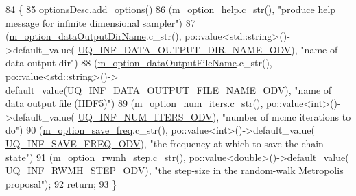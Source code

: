\begin{DoxyCode}
84 \{
85   optionsDesc.add\_options()
86     (\hyperlink{class_q_u_e_s_o_1_1_infinite_dimensional_m_c_m_c_sampler_options_a897fdd1438ecdd2cd9efe5b1abad55ba}{m\_option\_help}.c\_str(), \textcolor{stringliteral}{"produce help message for infinite dimensional sampler"})
87     (\hyperlink{class_q_u_e_s_o_1_1_infinite_dimensional_m_c_m_c_sampler_options_a75dac93b87f4e93ffef95b35c7382ad2}{m\_option\_dataOutputDirName}.c\_str(), po::value<std::string>()->default\_value(
      \hyperlink{_infinite_dimensional_m_c_m_c_sampler_options_8_c_aec1cc3af00e966ad1f72d4991db506f9}{UQ\_INF\_DATA\_OUTPUT\_DIR\_NAME\_ODV}), \textcolor{stringliteral}{"name of data output dir"})
88     (\hyperlink{class_q_u_e_s_o_1_1_infinite_dimensional_m_c_m_c_sampler_options_a4c405def589baa661b5e76f0ca0ef280}{m\_option\_dataOutputFileName}.c\_str(), po::value<std::string>()->
      default\_value(\hyperlink{_infinite_dimensional_m_c_m_c_sampler_options_8_c_a94a16132b1d2694fe1ba4602594e7bc7}{UQ\_INF\_DATA\_OUTPUT\_FILE\_NAME\_ODV}), \textcolor{stringliteral}{"name of data output file (HDF5)"})
89     (\hyperlink{class_q_u_e_s_o_1_1_infinite_dimensional_m_c_m_c_sampler_options_ab27e1a612339e516eb32b326e1dd6ed5}{m\_option\_num\_iters}.c\_str(), po::value<int>()->default\_value(
      \hyperlink{_infinite_dimensional_m_c_m_c_sampler_options_8_c_a09baf502e91d02389a48a0eb808826f3}{UQ\_INF\_NUM\_ITERS\_ODV}), \textcolor{stringliteral}{"number of mcmc iterations to do"})
90     (\hyperlink{class_q_u_e_s_o_1_1_infinite_dimensional_m_c_m_c_sampler_options_ac2ebcd1aff902c0b01fec2366fe775b6}{m\_option\_save\_freq}.c\_str(), po::value<int>()->default\_value(
      \hyperlink{_infinite_dimensional_m_c_m_c_sampler_options_8_c_ab6e147540aa260f27861a36a39443878}{UQ\_INF\_SAVE\_FREQ\_ODV}), \textcolor{stringliteral}{"the frequency at which to save the chain state"})
91     (\hyperlink{class_q_u_e_s_o_1_1_infinite_dimensional_m_c_m_c_sampler_options_aa76584eb25581942458195d26e032578}{m\_option\_rwmh\_step}.c\_str(), po::value<double>()->default\_value(
      \hyperlink{_infinite_dimensional_m_c_m_c_sampler_options_8_c_ab6dfe19abe6e2708a3bb7e50c07ee8da}{UQ\_INF\_RWMH\_STEP\_ODV}), \textcolor{stringliteral}{"the step-size in the random-walk Metropolis proposal"});
92   \textcolor{keywordflow}{return};
93 \}
\end{DoxyCode}

